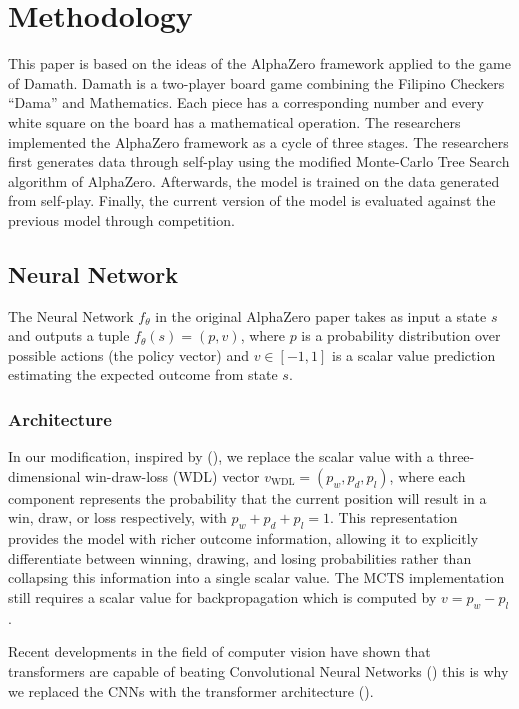 \chapter{Methodology}

This paper is based on the ideas of the AlphaZero framework applied to the game of Damath. Damath is a two-player board game combining the Filipino Checkers ``Dama'' and Mathematics. Each piece has a corresponding number and every  white square on the board has a mathematical operation. The researchers implemented the AlphaZero framework as a cycle of three stages. The researchers first generates data through self-play using the modified Monte-Carlo Tree Search algorithm of AlphaZero. Afterwards, the model is trained on the data generated from self-play. Finally, the current version of the model is evaluated against the previous model through competition.

\section{Neural Network}

The Neural Network $f_{\theta}$ in the original AlphaZero paper \cite{silver2017masteringchessshogiselfplay} takes as input a state $s$ and outputs a tuple $f_{\theta}(s) = (p, v)$, where $p$ is a probability distribution over possible actions (the policy vector) and $v \in [-1, 1]$ is a scalar value prediction estimating the expected outcome from state $s$.


\subsection{Architecture}

In our modification, inspired by (\cite{czech2024representationmattersmasteringchess}), we replace the scalar value with a three-dimensional win-draw-loss (WDL) vector $v_{\text{WDL}} = (p_w, p_d, p_l)$, where each component represents the probability that the current position will result in a win, draw, or loss respectively, with $p_w + p_d + p_l = 1$. This representation provides the model with richer outcome information, allowing it to explicitly differentiate between winning, drawing, and losing probabilities rather than collapsing this information into a single scalar value. The MCTS implementation still requires a scalar value for backpropagation which is computed by $v = p_w - p_l$.

Recent developments in the field of computer vision have shown that transformers are capable of beating Convolutional Neural Networks (\cite{dosovitskiy2021imageworth16x16words}) this is why we replaced the CNNs with the transformer architecture (\cite{vaswani2023attentionneed}).

